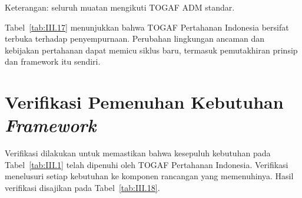 Keterangan: seluruh muatan mengikuti TOGAF ADM standar.

Tabel~\ref{tab:III.17} menunjukkan bahwa TOGAF Pertahanan Indonesia bersifat terbuka terhadap penyempurnaan. Perubahan lingkungan ancaman dan kebijakan pertahanan dapat memicu siklus baru, termasuk pemutakhiran prinsip dan framework itu sendiri.

\section{Verifikasi Pemenuhan Kebutuhan \textit{Framework}}
\label{sec:III.4}

Verifikasi dilakukan untuk memastikan bahwa kesepuluh kebutuhan pada Tabel~\ref{tab:III.1} telah dipenuhi oleh TOGAF Pertahanan Indonesia. Verifikasi menelusuri setiap kebutuhan ke komponen rancangan yang memenuhinya. Hasil verifikasi disajikan pada Tabel~\ref{tab:III.18}.

